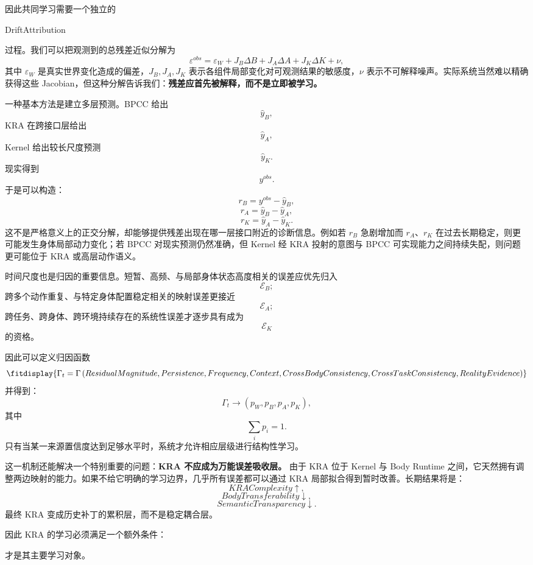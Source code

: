 因此共同学习需要一个独立的
\begin{statementbox}
DriftAttribution
\end{statementbox}
过程。我们可以把观测到的总残差近似分解为
\[
\varepsilon^{obs}
=
\varepsilon_W
+
J_B\Delta B
+
J_A\Delta A
+
J_K\Delta K
+
\nu,
\]
其中 $\varepsilon_W$ 是真实世界变化造成的偏差，$J_B,J_A,J_K$ 表示各组件局部变化对可观测结果的敏感度，$\nu$ 表示不可解释噪声。实际系统当然难以精确获得这些 Jacobian，但这种分解告诉我们：\textbf{残差应首先被解释，而不是立即被学习。}

一种基本方法是建立多层预测。BPCC 给出
\[
\hat y_B,
\]
KRA 在跨接口层给出
\[
\hat y_A,
\]
Kernel 给出较长尺度预测
\[
\hat y_K.
\]
现实得到
\[
y^{obs}.
\]
于是可以构造：
\[
r_B
=
y^{obs}-\hat y_B,
\]
\[
r_A
=
\hat y_B-\hat y_A,
\]
\[
r_K
=
\hat y_A-\hat y_K.
\]
这不是严格意义上的正交分解，却能够提供残差出现在哪一层接口附近的诊断信息。例如若 $r_B$ 急剧增加而 $r_A$、$r_K$ 在过去长期稳定，则更可能发生身体局部动力变化；若 BPCC 对现实预测仍然准确，但 Kernel 经 KRA 投射的意图与 BPCC 可实现能力之间持续失配，则问题更可能位于 KRA 或高层动作语义。

时间尺度也是归因的重要信息。短暂、高频、与局部身体状态高度相关的误差应优先归入
\[
\mathcal E_B;
\]
跨多个动作重复、与特定身体配置稳定相关的映射误差更接近
\[
\mathcal E_A;
\]
跨任务、跨身体、跨环境持续存在的系统性误差才逐步具有成为
\[
\mathcal E_K
\]
的资格。

因此可以定义归因函数
\[
\fitdisplay{
\Gamma_t
=
\Gamma
\left(
ResidualMagnitude,
Persistence,
Frequency,
Context,
CrossBodyConsistency,
CrossTaskConsistency,
RealityEvidence
\right)
}
\]
并得到：
\[
\Gamma_t
\rightarrow
\left(
p_W,p_B,p_A,p_K
\right),
\]
其中
\[
\sum_i p_i=1.
\]
只有当某一来源置信度达到足够水平时，系统才允许相应层级进行结构性学习。

这一机制还能解决一个特别重要的问题：\textbf{KRA 不应成为万能误差吸收层。} 由于 KRA 位于 Kernel 与 Body Runtime 之间，它天然拥有调整两边映射的能力。如果不给它明确的学习边界，几乎所有误差都可以通过 KRA 局部拟合得到暂时改善。长期结果将是：
\[
KRAComplexity\uparrow,
\]
\[
BodyTransferability\downarrow,
\]
\[
SemanticTransparency\downarrow.
\]
最终 KRA 变成历史补丁的累积层，而不是稳定耦合层。

因此 KRA 的学习必须满足一个额外条件：
\begin{statementbox}
\centering
{}
\end{statementbox}
才是其主要学习对象。

